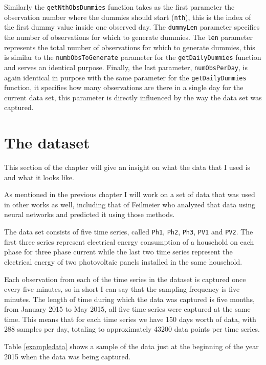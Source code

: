 \documentclass[12pt,a4paper,titlepage]{report}
\begin{document}
Similarly the \texttt{getNthObsDummies} function takes as the first parameter the observation number where the dummies should start (\texttt{nth}), this is the index of the first dummy value inside one observed day. The \texttt{dummyLen} parameter specifies the number of observations for which to generate dummies. The \texttt{len} parameter represents the total number of observations for which to generate dummies, this is similar to the   \texttt{numbObsToGenerate} parameter for the \texttt{getDailyDummies} function and serves an identical purpose. Finally, the last parameter, \texttt{numObsPerDay}, is again identical in purpose with the same parameter for the \texttt{getDailyDummies} function, it specifies how many observations are there in a single day for the current data set, this parameter is directly influenced by the way the data set was captured.

\section{The dataset} \label{datasetsection}
This section of the chapter will give an insight on what the data that I used is and what it looks like.

As mentioned in the previous chapter I will work on a set of data that was used in other works as well, including that of Feilmeier \cite{feilmeier} who analyzed that data using neural networks and predicted it using those methods.

The data set consists of five time series, called \texttt{Ph1}, \texttt{Ph2}, \texttt{Ph3}, \texttt{PV1} and \texttt{PV2}.
The first three series represent electrical energy consumption of a household on each phase for three phase current while the last two time series represent the electrical energy of two photovoltaic panels installed in the same household.

Each observation from each of the time series in the dataset is captured once every five minutes, so in short I can say that the sampling frequency is five minutes.
The length of time during which the data was captured is five months, from January 2015 to May 2015, all five time series were captured at the same time. This means that for each time series we have 150 days worth of data, with 288 samples per day,  totaling to approximately 43200 data points per time series.

Table \ref{exampledata} shows a sample of the data just at the beginning of the year 2015 when the data was being captured.
\end{document}
